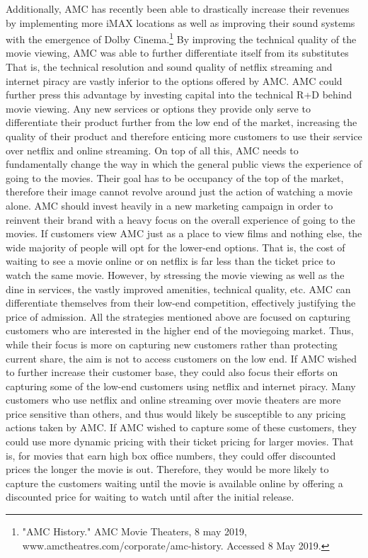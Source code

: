 \documentclass[12pt]{article}
\begin{document}
Additionally, AMC has recently been able to drastically increase their revenues by implementing more iMAX locations as well as improving their sound systems with the emergence of Dolby Cinema.\footnote{"AMC History." AMC Movie Theaters, 8 may 2019, www.amctheatres.com/corporate/amc-history. Accessed 8 
     May 2019. } By improving the technical quality of the movie viewing, AMC was able to further differentiate itself from its substitutes That is, the technical resolution and sound quality of netflix streaming and internet piracy are vastly inferior to the options offered by AMC. AMC could further press this advantage by investing capital into the technical R+D behind movie viewing. Any new services or options they provide only serve to differentiate their product further from the low end of the market, increasing the quality of their product and therefore enticing more customers to use their service over netflix and online streaming. 
On top of all this, AMC needs to fundamentally change the way in which the general public views the experience of going to the movies. Their goal has to be occupancy of the top of the market, therefore their image cannot revolve around just the action of watching a movie alone. AMC should invest heavily in a new marketing campaign in order to reinvent their brand with a heavy focus on the overall experience of going to the movies. If customers view AMC just as a place to view films and nothing else, the wide majority of people will opt for the lower-end options. That is, the cost of waiting to see a movie online or on netflix is far less than the ticket price to watch the same movie. However, by stressing the movie viewing as well as the dine in services, the vastly improved amenities, technical quality, etc. AMC can differentiate themselves from their low-end competition, effectively justifying the price of admission.  
All the strategies mentioned above are focused on capturing customers who are interested in the higher end of the moviegoing market. Thus, while their focus is more on capturing new customers rather than protecting current share, the aim is not to access customers on the low end. If AMC wished to further increase their customer base, they could also focus their efforts on capturing some of the low-end customers using netflix and internet piracy. Many customers who use netflix and online streaming over movie theaters are more price sensitive than others, and thus would likely be susceptible to any pricing actions taken by AMC. If AMC wished to capture some of these customers, they could use more dynamic pricing with their ticket pricing for larger movies. That is, for movies that earn high box office numbers, they could offer discounted prices the longer the movie is out. Therefore, they would be more likely to capture the customers waiting until the movie is available online by offering a discounted price for waiting to watch until after the initial release. 
\end{document}
